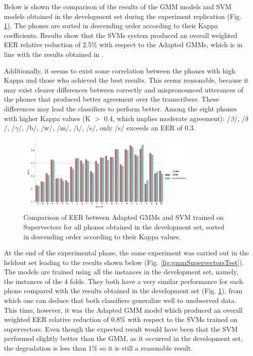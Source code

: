 Below is shown the
comparison of the results of the GMM models and
SVM models obtained in the development set during the experiment
replication (Fig. \ref{fig:gmmSupervectorsDev}).
The phones are sorted in descending order according to their Kappa coefficients.
Results show that the SVMs system produced an overall weighted EER relative reduction of 2.5\% with
respect to the Adapted GMMs, which is in line with the results obtained
in \cite{main}.

Additionally, it seems to exist some correlation between the phones with high Kappa
and those who achieved
the best results. This seems reasonable, because it may exist clearer differences
between correctly and mispronounced
utterances of the phones that produced better agreement over the transcribers.
These differences may lead the classifiers to perform better.
Among the eight phones with higher Kappa values (K $>$ 0.4, which implies moderate agreement):
/$\beta$/, /$\delta$/, /$\gamma$/, /b/, /w/, /m/, /i/, /s/, only /s/ exceeds an EER of 0.3.

\begin{figure}[H]
	\centering
	\includegraphics[width=0.8\textwidth]{files/figures/results/gmm-vs-supervectors/gmm-vs-supervectors-dev.png}
	\caption{Comparison of EER between Adapted GMMs
	and SVM trained on Supervectors for all phones obtained in the development set, sorted
	in descending order according to their Kappa values.}
	\label{fig:gmmSupervectorsDev}
\end{figure}

At the end of the experimental phase,
the same experiment was carried out in the heldout set
leading to the results shown below
(Fig. \ref{fig:gmmSupervectorsTest}).
The models are trained using all the instances in the development set, namely, the
instances of the 4 folds.
They both have a very similar performance for each phone compared with the results obtained
in the development set (Fig. \ref{fig:gmmSupervectorsDev}),
from which one can deduce that both classifiers generalize well to
unobserved data. This time, however, it was the Adapted GMM model
which produced an overall weighted EER relative reduction of 0.8\% with respect to the SVMs
trained on supervectors. Even though the expected result would have been that the SVM performed
slightly better than the GMM, as it occurred in the development set,
the degradation is less than 1\% so it is still a reasonable result.

